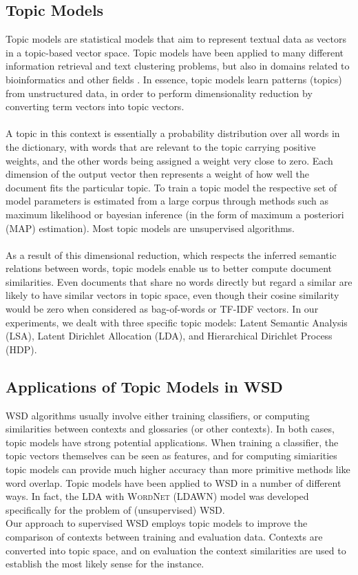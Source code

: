 \subsection{Topic Models}
Topic models are statistical models that aim to represent textual data as vectors in a topic-based vector space. Topic models have been applied to many different information retrieval and text clustering problems, but also in domains related to bioinformatics and other fields \cite{topicmodel_applications}. In essence, topic models learn patterns (topics) from unstructured data, in order to perform dimensionality reduction by converting term vectors into topic vectors. \\\\
A topic in this context is essentially a probability distribution over all words in the dictionary, with words that are relevant to the topic carrying positive weights, and the other words being assigned a weight very close to zero. Each dimension of the output vector then represents a weight of how well the document fits the particular topic. To train a topic model the respective set of model parameters is estimated from a large corpus through methods such as maximum likelihood or bayesian inference (in the form of maximum a posteriori (MAP) estimation). Most topic models are unsupervised algorithms.\\\\
As a result of this dimensional reduction, which respects the inferred semantic relations between words, topic models enable us to better compute document similarities. Even documents that share no words directly but regard a similar are likely to have similar vectors in topic space, even though their cosine similarity would be zero when considered as bag-of-words or TF-IDF vectors. In our experiments, we dealt with three specific topic models: Latent Semantic Analysis (LSA)\cite{LSA_paper}, Latent Dirichlet Allocation (LDA)\cite{LDA_paper}, and Hierarchical Dirichlet Process (HDP)\cite{HDP_paper}.


\subsection{Applications of Topic Models in WSD}
WSD algorithms usually involve either training classifiers, or computing similarities between contexts and glossaries (or other contexts). In both cases, topic models have strong potential applications. When training a classifier, the topic vectors themselves can be seen as features, and for computing simiarities topic models can provide much higher accuracy than more primitive methods like word overlap. Topic models have been applied to WSD in a number of different ways\cite{topic_models_in_wsd}. In fact, the LDA with \textsc{WordNet} (LDAWN) model was developed specifically for the problem of (unsupervised) WSD. \\
Our approach to supervised WSD employs topic models to improve the comparison of contexts between training and evaluation data. Contexts are converted into topic space, and on evaluation the context similarities are used to establish the most likely sense for the instance.